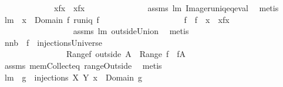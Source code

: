\begin{isabellebody}
\ \ \ \ \ \ \ \ \ \ \ \ \ {\isachardoublequoteopen}{\isacharbraceleft}x{\isacharbraceright}{\isasymtimes}f{\isacharbackquote}{\isacharbackquote}{\isacharbraceleft}x{\isacharbraceright}\ {\isacharequal}\ {\isacharbraceleft}{\isacharparenleft}x{\isacharcomma}f{\isacharcomma}{\isacharcomma}x{\isacharparenright}{\isacharbraceright}{\isachardoublequoteclose}\ \isanewline
%
\isadelimproof
\ \ \ \ \ \ \ \ \ \ \ \ %
\endisadelimproof
%
\isatagproof
{}\isamarkupfalse%
\ assms\ lm{}{}\ Image{\isacharunderscore}runiq{\isacharunderscore}eq{\isacharunderscore}eval\ \isamarkupfalse%
\ metis%
\endisatagproof
{\isafoldproof}%
%
\isadelimproof
\isanewline
%
\endisadelimproof
\isanewline
{}\isamarkupfalse%
\ lm{}{}{\isacharcolon}\ \ {\isachardoublequoteopen}x\ {\isasymin}\ Domain\ f{\isachardoublequoteclose}\ {\isachardoublequoteopen}runiq\ f{\isachardoublequoteclose}\ \isanewline
\ \ \ \ \ \ \ \ \ \ \ \ \ \ \ \ \ \ \ {\isachardoublequoteopen}f\ {\isacharequal}\ {\isacharparenleft}f\ {\isacharminus}{\isacharminus}\ x{\isacharparenright}\ {\isasymunion}\ {\isacharbraceleft}{\isacharparenleft}x{\isacharcomma}f{\isacharcomma}{\isacharcomma}x{\isacharparenright}{\isacharbraceright}{\isachardoublequoteclose}\ \isanewline
%
\isadelimproof
\ \ \ \ \ \ \ \ \ \ \ \ \ \ \ \ %
\endisadelimproof
%
\isatagproof
{}\isamarkupfalse%
\ assms\ lm{}{}\ outsideUnion\ \isamarkupfalse%
\ metis%
\endisatagproof
{\isafoldproof}%
%
\isadelimproof
\isanewline
%
\endisadelimproof
\isanewline
{}\isamarkupfalse%
\ nn{}{}b{\isacharcolon}\ \ {\isachardoublequoteopen}f\ {\isasymin}\ injectionsUniverse{\isachardoublequoteclose}\ \isanewline
\ \ \ \ \ \ \ \ \ \ \ \ \ \ \ \ {\isachardoublequoteopen}Range{\isacharparenleft}f\ outside\ A{\isacharparenright}\ {\isacharequal}\ Range\ f\ {\isacharminus}\ f{\isacharbackquote}{\isacharbackquote}A{\isachardoublequoteclose}\ \isanewline
%
\isadelimproof
\ \ \ \ \ \ \ \ \ \ \ \ \ %
\endisadelimproof
%
\isatagproof
{}\isamarkupfalse%
\ assms\ mem{\isacharunderscore}Collect{\isacharunderscore}eq\ rangeOutside\ \isamarkupfalse%
\ {\isacharparenleft}metis{\isacharparenright}%
\endisatagproof
{\isafoldproof}%
%
\isadelimproof
\isanewline
%
\endisadelimproof
\isanewline
{}\isamarkupfalse%
\ lm{}{}{\isacharcolon}\ \ {\isachardoublequoteopen}g\ {\isasymin}\ injections{\isacharprime}\ X\ Y{\isachardoublequoteclose}\ {\isachardoublequoteopen}x\ {\isasymin}\ Domain\ g{\isachardoublequoteclose}\ \isanewline

\end{isabellebody}
